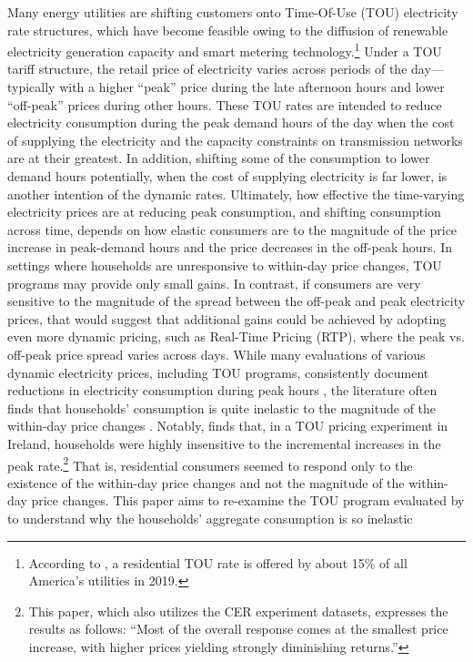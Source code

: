 Many energy utilities are shifting customers onto Time-Of-Use (TOU) electricity rate structures, which have become feasible owing to the diffusion of renewable electricity generation capacity and smart metering technology.\footnote{According to \cite{A-Survey-of-Residential-TOU-Rates_FHS_2019}, a residential TOU rate is offered by about 15\% of all America's utilities in 2019.} Under a TOU tariff structure, the retail price of electricity varies across periods of the day---typically with a higher ``peak'' price during the late afternoon hours and lower ``off-peak'' prices during other hours. These TOU rates are intended to reduce electricity consumption during the peak demand hours of the day when the cost of supplying the electricity and the capacity constraints on transmission networks are at their greatest. In addition, shifting some of the consumption to lower demand hours potentially, when the cost of supplying electricity is far lower, is another intention of the dynamic rates. Ultimately, how effective the time-varying electricity prices are at reducing peak consumption, and shifting consumption across time, depends on how elastic consumers are to the magnitude of the price increase in peak-demand hours and the price decreases in the off-peak hours. In settings where households are unresponsive to within-day price changes, TOU programs may provide only small gains. In contrast, if consumers are very sensitive to the magnitude of the spread between the off-peak and peak electricity prices, that would suggest that additional gains could be achieved by adopting even more dynamic pricing, such as Real-Time Pricing (RTP), where the peak vs. off-peak price spread varies across days. While many evaluations of various dynamic electricity prices, including TOU programs, consistently document reductions in electricity consumption during peak hours \citep{Quantifying-Customer-Response-to-Dynamic-Pricing_Faruqui-and-George_2005, Dynamic-Pricing-of-Electricity-in-the-Mid-Atlantic-Region_Econometric-Results-from-the-Baltimore-Gas-and-Electric-Company-Experiment_Faruqui-et-al_2011, Dynamic-Pricing-of-Electricity-for-Residential-Customers_The-Evidence-from-Michigan_Faruqui-et-al_2013}, the literature often finds that households' consumption is quite inelastic to the magnitude of the within-day price changes \citep{Rethinking-Real-Time-Electricity-Pricing_Allcott_2011, Knowledge-is-Less-Power_Jessoe-and-Rapson_2014}. Notably, \cite{Peaking-Interest:How-Awareness-Drives-the-Effectiveness-of-Time-of-Use-Electricity-Pricing_Prest_2020} finds that, in a TOU pricing experiment in Ireland, households were highly insensitive to the incremental increases in the peak rate.\footnote{This paper, which also utilizes the CER experiment datasets, expresses the results as follows: ``Most of the overall response comes at the smallest price increase, with higher prices yielding strongly diminishing returns.''} That is, residential consumers seemed to respond only to the existence of the within-day price changes and not the magnitude of the within-day price changes. This paper aims to re-examine the TOU program evaluated by \cite{Peaking-Interest:How-Awareness-Drives-the-Effectiveness-of-Time-of-Use-Electricity-Pricing_Prest_2020} to understand why the households' aggregate consumption is so inelastic 